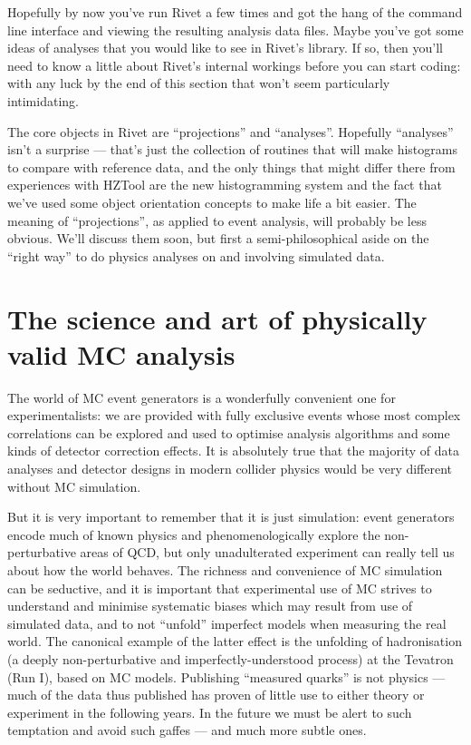 Hopefully by now you've run Rivet a few times and got the hang of the command
line interface and viewing the resulting analysis data files. Maybe you've got
some ideas of analyses that you would like to see in Rivet's library. If so,
then you'll need to know a little about Rivet's internal workings before you can
start coding: with any luck by the end of this section that won't seem
particularly intimidating.

The core objects in Rivet are ``projections'' and ``analyses''. Hopefully
``analyses'' isn't a surprise --- that's just the collection of routines that
will make histograms to compare with reference data, and the only things that
might differ there from experiences with HZTool\cite{Bromley:1995np} are the new histogramming system
and the fact that we've used some object orientation concepts to make life a bit
easier. The meaning of ``projections'', as applied to event analysis, will
probably be less obvious. We'll discuss them soon, but first a
semi-philosophical aside on the ``right way'' to do physics analyses on and
involving simulated data.


\section{The science and art of physically valid MC analysis}

The world of MC event generators is a wonderfully convenient one for
experimentalists: we are provided with fully exclusive events whose most complex
correlations can be explored and used to optimise analysis algorithms and some
kinds of detector correction effects. It is absolutely true that the majority of
data analyses and detector designs in modern collider physics would be very
different without MC simulation.

But it is very important to remember that it is just simulation: event
generators encode much of known physics and phenomenologically explore the
non-perturbative areas of QCD, but only unadulterated experiment can really tell
us about how the world behaves. The richness and convenience of MC simulation
can be seductive, and it is important that experimental use of MC strives to
understand and minimise systematic biases which may result from use of simulated
data, and to not ``unfold'' imperfect models when measuring the real world. The
canonical example of the latter effect is the unfolding of hadronisation (a
deeply non-perturbative and imperfectly-understood process) at the Tevatron (Run
I), based on MC models. Publishing ``measured quarks'' is not physics --- much
of the data thus published has proven of little use to either theory or
experiment in the following years. In the future we must be alert to such
temptation and avoid such gaffes --- and much more subtle ones.

